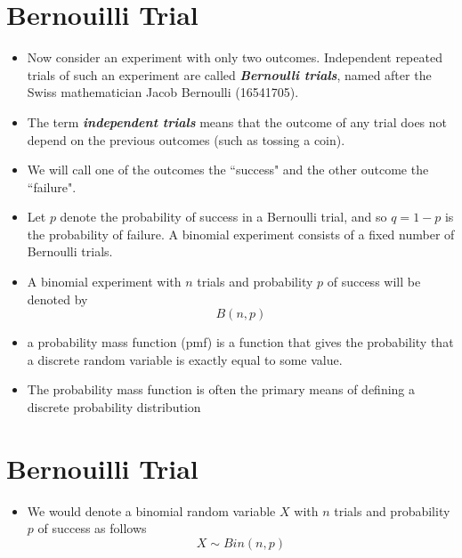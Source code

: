 
\section{Bernouilli Trial}
\begin{itemize}
	\item Now consider an experiment with only two outcomes. Independent repeated trials of such an experiment are
	called \textbf{\textit{Bernoulli trials}}, named after the Swiss mathematician Jacob Bernoulli (16541705). \item The term \textbf{\emph{independent
			trials}} means that the outcome of any trial does not depend on the previous outcomes (such as tossing a coin).
	\item We will call one of the outcomes the ``success" and the other outcome the ``failure".
	
	\item
	Let $p$ denote the probability of success in a Bernoulli trial, and so $q = 1 - p$ is the probability of failure.
	A binomial experiment consists of a fixed number of Bernoulli trials. \item A binomial experiment with $n$ trials and
	probability $p$ of success will be denoted by
	\[B(n, p)\]
	\item a probability mass function (pmf) is a function that gives the probability that a 
	discrete random variable is exactly equal to some value. 
	\item The probability mass function is often the primary means of defining a discrete probability distribution 
\end{itemize}


\section*{Bernouilli Trial}
\begin{itemize}


\item We would denote a binomial random variable $X$ with $n$ trials and
probability $p$ of success as follows
\[X \sim Bin(n, p)\]

\end{itemize}



